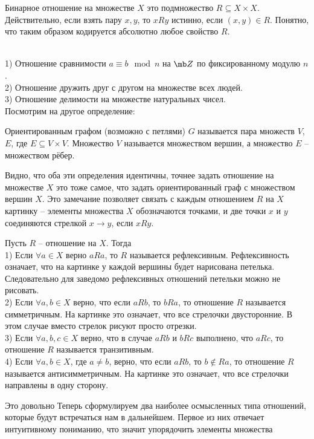 \dfn Бинарное отношение на множестве $X$ это подмножество $R \subseteq X\times X$.
\edfn
Действительно, если взять пару $x,y$, то $x R y$ истинно, если $(x,y)\in R$. Понятно, что таким образом кодируется абсолютно любое свойство $R$.

\exm \\
1) Отношение сравнимости $a\equiv b \mod n$ на $\mb Z$ по фиксированному модулю $n$.\\
2) Отношение дружить друг с другом на множестве всех людей.\\
3) Отношение делимости на множестве натуральных чисел.\\


Посмотрим на другое определение:

\dfn Ориентированным графом (возможно с петлями) $G$ называется пара множеств $V$, $E$, где $E \subseteq V \times V$. Множество $V$ называется множеством вершин, а множество $E$ -- множеством рёбер.
\edfn



Видно, что оба эти определения идентичны, точнее задать отношение на множестве $X$ это тоже самое, что задать ориентированный граф с множеством вершин $X$. Это замечание позволяет связать с каждым отношением $R$ на $X$ картинку -- элементы множества $X$ обозначаются точками, и две точки $x$ и $y$ соединяются стрелкой $x \to y$, если $x R y$.



\dfn Пусть  $R$ -- отношение на $X$. Тогда\\
1) Если $\forall a \in X$ верно $a R a$, то $R$ называется рефлексивным. Рефлексивность означает, что на картинке у каждой вершины будет нарисована петелька. Следовательно для заведомо рефлексивных отношений петельки можно не рисовать.\\
2) Если $\forall a,b \in X$ верно, что если $a R b$, то $b R a$, то отношение $R$ называется симметричным. На картинке это означает, что все стрелочки двусторонние. В этом случае вместо стрелок рисуют просто отрезки.\\
3) Если $\forall a,b,c \in X$ верно, что в случае $aR b $ и $b R c$ выполнено, что $a R c$, то отношение $R$ называется транзитивным.\\
4) Если $\forall a,b \in X$, где $a\neq b$, верно, что если $a R b$, то $b \notin R a$, то отношение $R$ называется антисимметричным. На картинке это означает, что все стрелочки направлены в одну сторону.\\
\edfn

Это довольно Теперь сформулируем два наиболее осмысленных типа отношений, которые будут встречаться нам в дальнейшем. Первое из них отвечает интуитивному пониманию, что значит упорядочить элементы множества



